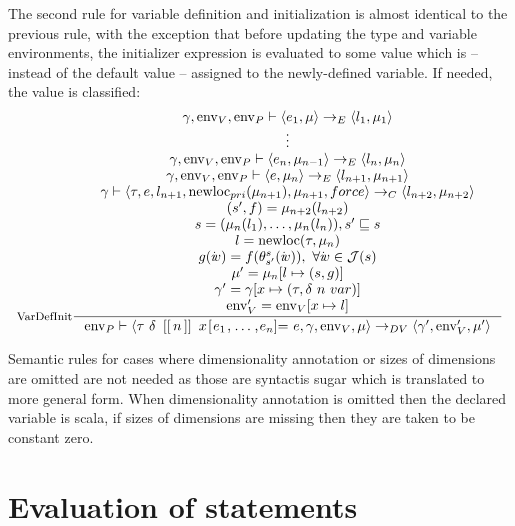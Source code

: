 \documentclass[a4paper, 10pt, draft]{report}
\DeclareMathOperator*{\env}{env}
\DeclareMathOperator*{\newloc}{newloc}
\newcommand{\mycode}[1]{\ensuremath{\mbox{\lstinline{#1}}}}
\begin{document}
The second rule for variable definition and initialization is almost identical
to the previous rule, with the exception that before updating the type and
variable environments, the initializer expression is evaluated to some value
which is -- instead of the default value -- assigned to the newly-defined
variable. If needed, the value is classified:
{\small \[ \inference[VarDefInit]{
  \gamma, \env_V, \env_P |- \left<e_1, \mu \right> \to_E \left< l_1, \mu_1\right> \\
  \vdots \\
  \gamma, \env_V, \env_P |- \left<e_n, \mu_{n-1} \right> \to_E \left< l_n, \mu_n\right> \\
  \gamma, \env_V, \env_P |- \left<e, \mu_n \right> \to_E \left< l_{n+1}, \mu_{n+1}\right> \\
  \gamma |- \left< \tau, e, l_{n+1}, \newloc_{pri}(\mu_{n+1}), \mu_{n+1}, force \right> \to_C \left< l_{n+2}, \mu_{n+2} \right> \\
  (s',f) = \mu_{n+2}(l_{n+2}) \\
  s = (\mu_n(l_1), \ldots,  \mu_n(l_n)), s' \sqsubseteq s \\
  l = \newloc(\tau, \mu_n)\\
  g(i\!v) = f(\theta_{s'}^{s}(i\!v)),\ \forall i\!v \in \mathcal{J}(s) \\
  \mu' = \mu_n[l \mapsto (s, g)] \\
  \gamma' = \gamma[x \mapsto (\tau, \delta\ n\ var)] \\
  \env'_V = \env_V[x \mapsto l] \\
}{
  \env_P |- \left<\tau\ \delta\ \mycode{[[}n\mycode{]]}\ x\mycode{[}e_1\mycode{,}\ldots\mycode{,}e_n\mycode{]=}\ e, \gamma, \env_V, \mu \right> \to_{DV}
            \left< \gamma', \env'_V, \mu' \right>
} \] }

Semantic rules for cases where dimensionality annotation or sizes of dimensions
are omitted are not needed as those are syntactis sugar which is translated to
more general form. When dimensionality annotation is omitted then the declared
variable is scala, if sizes of dimensions are missing then they are taken to be
constant zero. 

\section{Evaluation of statements}\label{sec:semantics:statements}
\end{document}
